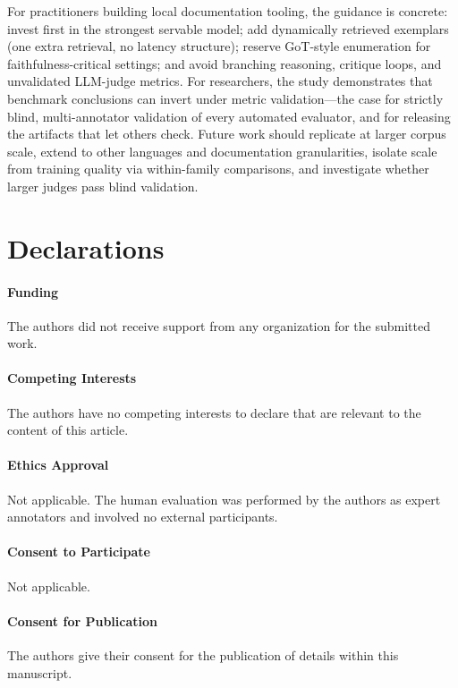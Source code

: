 \documentclass[pdflatex,sn-mathphys-ay]{sn-jnl}%
\theoremstyle{thmstyleone}%
\theoremstyle{thmstyletwo}%
\theoremstyle{thmstylethree}%
\begin{document}
For practitioners building local documentation tooling, the guidance is concrete: invest first in the strongest servable model; add dynamically retrieved exemplars (one extra retrieval, no latency structure); reserve GoT-style enumeration for faithfulness-critical settings; and avoid branching reasoning, critique loops, and unvalidated LLM-judge metrics. For researchers, the study demonstrates that benchmark conclusions can invert under metric validation---the case for strictly blind, multi-annotator validation of every automated evaluator, and for releasing the artifacts that let others check. Future work should replicate at larger corpus scale, extend to other languages and documentation granularities, isolate scale from training quality via within-family comparisons, and investigate whether larger judges pass blind validation.

\section*{Declarations}

\paragraph{Funding}
The authors did not receive support from any organization for the submitted work.

\paragraph{Competing Interests}
The authors have no competing interests to declare that are relevant to the content of this article.

\paragraph{Ethics Approval}
Not applicable. The human evaluation was performed by the authors as expert annotators and involved no external participants.

\paragraph{Consent to Participate}
Not applicable.

\paragraph{Consent for Publication}
The authors give their consent for the publication of details within this manuscript.
\end{document}
